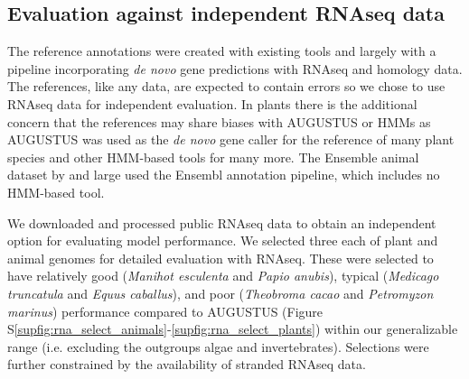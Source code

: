 \documentclass{bioinfo}
\newcounter{supfig}
\begin{document}
\begin{methods}
\subsection{Evaluation against independent RNAseq data}
\label{sec:rnaseq}
The reference annotations were created with existing tools and largely with a pipeline incorporating
{\it de novo} gene predictions with RNAseq and homology data. The references, like any
data, are expected to contain errors so we chose to use RNAseq data for independent evaluation.
In plants there is the additional concern that the references may share biases with
AUGUSTUS or HMMs as AUGUSTUS was used as the {\it de novo} gene caller for the reference of
many plant species %
and other HMM-based tools for many more. %
The Ensemble animal dataset by and large
used the Ensembl annotation pipeline, which includes no HMM-based tool.

We downloaded and processed public RNAseq data to obtain an independent option 
for evaluating model performance. We selected three each of plant and animal genomes for
detailed evaluation with RNAseq. These were selected to have relatively good 
({\it Manihot esculenta} and {\it Papio anubis}), 
typical ({\it Medicago truncatula} and {\it Equus caballus}), 
and poor ({\it Theobroma cacao} and {\it Petromyzon marinus})
performance compared to AUGUSTUS (Figure S\ref{supfig:rna_select_animals}-\ref{supfig:rna_select_plants}) %
within our generalizable range (i.e. excluding the outgroups algae and
invertebrates). Selections were further constrained by the availability of stranded RNAseq
data. 


\end{methods}
\end{document}
